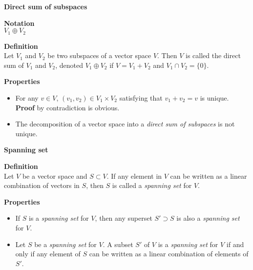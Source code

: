 \documentclass{article}
\begin{document}
\begin{framed}

    \textbf{Direct sum of subspaces}

    \begin{framed}
        \textbf{Notation}\\
        $V_{1}\oplus V_{2}$
    \end{framed}

    \begin{framed}
        \textbf{Definition}\\
        Let $V_{1}$ and $V_{2}$ be two subspaces of a vector space $V$. Then $V$ is called the direct sum of $V_{1}$ and $V_{2}$, denoted $V_{1} \oplus V_{2}$ if $V = V_{1}+V_{2}$ and $V_{1}\cap V_{2} = \{0\}$.
    \end{framed}

    \begin{framed}
        \textbf{Properties}
        \begin{itemize}
            \item For any $v\in V$, $(v_{1},v_{2})\in V_{1}\times V_{2}$ satisfying that $v_{1}+v_{2}=v$ is unique. \textbf{Proof} by contradiction is obvious.
            \item The decomposition of a vector space into a \textit{direct sum of subspaces} is not unique.
        \end{itemize}
    \end{framed}

\end{framed}

\newpage

\begin{framed}

    \textbf{Spanning set}

    \begin{framed}
        \textbf{Definition}\\
        Let $V$ be a vector space and $S\subset V$. If any element in $V$ can be written as a linear combination of vectors in $S$, then $S$ is called a \textit{spanning set} for $V$.
    \end{framed}

    \begin{framed}
        \textbf{Properties}
        \begin{itemize}
            \item If $S$ is a \textit{spanning set} for $V$, then any superset $S'\supset S$ is also a \textit{spanning set} for $V$.
            \item Let $S$ be a \textit{spanning set} for $V$. A subset $S'$ of $V$ is a \textit{spanning set} for $V$ if and only if any element of $S$ can be written as a linear combination of elements of $S'$.
        \end{itemize}
    \end{framed}

\end{framed}
\end{document}
